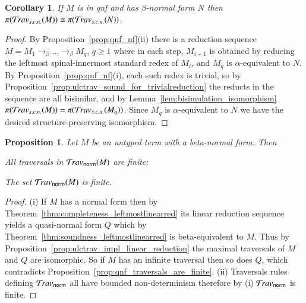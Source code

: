 \documentclass{elsarticle}
\theoremstyle{plain}
\newtheorem{proposition}[theorem]{Proposition}
\newtheorem{corollary}[theorem]{Corollary}
\theoremstyle{definition}
\newcommand{\normalizing}{{\sf norm}}
\newcommand{\travsetnorm}{\travset_\normalizing} %
\newcommand{\travsetscn}{\travset_{s.c.n.}} %
\def\coresymbol{\pi} %
\newcommand{\core}[1]{\coresymbol(#1)} %
\begin{document}
\begin{corollary}
\label{cor:qnf_and_nf_traveset_invariant}
If $M$ is in \emph{qnf} and has $\beta$-normal form $N$ then $\coresymbol(\travsetscn(M)) \cong \coresymbol(\travsetscn(N))$.
\end{corollary}
\begin{proof}
By Proposition~\ref{prop:qnf_nf}(ii) %
 there is a reduction sequence $M = M_1 \rightarrow_\beta \ldots \rightarrow_\beta M_q$, $q\geq1$  where in each step, $M_{i+1}$ is obtained by reducing the leftmost spinal-innermost standard redex of $M_i$,
and $M_q$ is $\alpha$-equivalent to $N$.
By Proposition~\ref{prop:qnf_nf}(i), each such redex is trivial, so by Proposition~\ref{prop:ulctrav_sound_for_trivialreduction}
the reducts in the sequence are all bisimilar, and by Lemma~\ref{lem:bisimulation_isomorphism}
$\core{\travsetscn(M)} = \core{\travsetscn(M_q)}$. Since $M_q$ is $\alpha$-equivalent to $N$ we have the desired structure-preserving isomorphism.
\end{proof}

\begin{proposition}
\label{prop:ulc_travnorm_finite}
Let $M$ be an untyped term with a beta-normal form. Then
\begin{enumerate*}[label=(\roman*)]
\item All traversals in $\travsetnorm(M)$ are finite;
\item The set $\travsetnorm(M)$ is finite.
\end{enumerate*}
\end{proposition}
\begin{proof}
(i) If $M$ has a normal form then by Theorem~\ref{thm:completeness_leftmostlinearred} its linear reduction sequence yields a quasi-normal form $Q$ which by Theorem~\ref{thm:soundness_leftmostlinearred} is beta-equivalent to $M$. Thus by Proposition~\ref{prop:ulctrav_impl_linear_reduction} the maximal traversals of $M$ and $Q$ are isomorphic. So if $M$ has an infinite traversal then so does $Q$, which contradicts Proposition~\ref{prop:qnf_traversals_are_finite}.
(ii) Traversals rules defining $\travsetnorm$ all have bounded non-determinism therefore by (i) $\travsetnorm$ is finite.
\end{proof}
\end{document}
